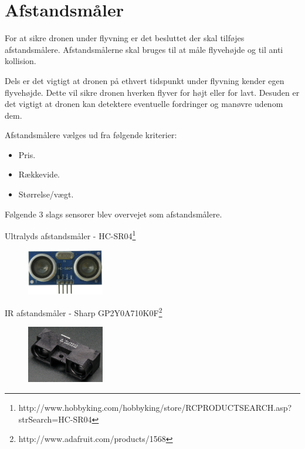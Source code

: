 \section{Afstandsmåler}

For at sikre dronen under flyvning er det besluttet der skal tilføjes afstandsmålere. Afstandsmålerne skal bruges til at måle flyvehøjde og til anti kollision.

Dels er det vigtigt at dronen på ethvert tidspunkt under flyvning kender egen flyvehøjde. Dette vil sikre dronen hverken flyver for højt eller for lavt. Desuden er det vigtigt at dronen kan detektere eventuelle fordringer og manøvre udenom dem.

Afstandsmålere vælges ud fra følgende kriterier:  
\begin{itemize}
	\item Pris.
	\item Rækkevide. 
	\item Størrelse/vægt. 
\end{itemize}

\vspace{0.5cm}

Følgende 3 slags sensorer blev overvejet som afstandsmålere. 

\centering
Ultralyds afstandsmåler - HC-SR04\footnote{http://www.hobbyking.com/hobbyking/store/RC\textunderscore PRODUCT\textunderscore SEARCH.asp?strSearch=HC-SR04}

\begin{figure}[H]
\centering
\includegraphics[width=0.3\textwidth]{Billeder/Afstandsmaler/ultra_sensor.png}
\label{fig:ultra_sensor}
\end{figure}



IR afstandsmåler - Sharp GP2Y0A710K0F\footnote{http://www.adafruit.com/products/1568}
\begin{figure}[H]
\centering
\includegraphics[width=0.3\textwidth]{Billeder/Afstandsmaler/ir_sensor.png}
\label{fig:ir_sensor}
\end{figure}

